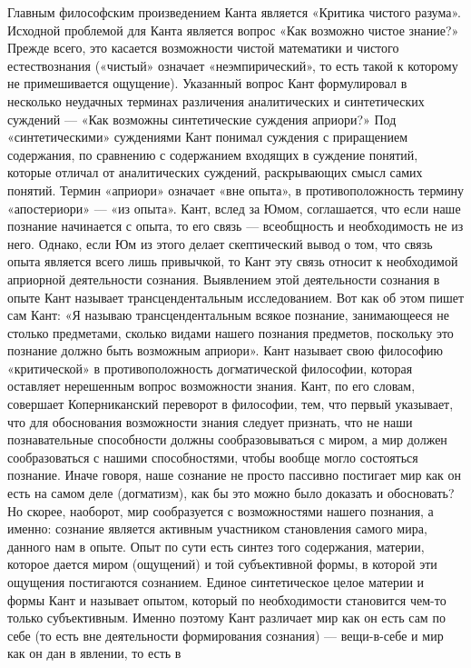 \documentclass[12pt]{article}
\begin{document}
Главным философским произведением Канта является «Критика чистого разума». Исходной проблемой для
Канта является вопрос «Как возможно чистое знание?» Прежде всего, это касается возможности чистой
математики и чистого естествознания («чистый» означает «неэмпирический», то есть такой к которому не
примешивается ощущение). Указанный вопрос Кант формулировал в несколько неудачных терминах
различения аналитических и синтетических суждений — «Как возможны синтетические суждения априори?»
Под «синтетическими» суждениями Кант понимал суждения с приращением содержания, по сравнению с
содержанием входящих в суждение понятий, которые отличал от аналитических суждений, раскрывающих
смысл самих понятий. Термин «априори» означает «вне опыта», в противоположность термину «апостериори»
— «из опыта». Кант, вслед за Юмом, соглашается, что если наше познание начинается с опыта, то его связь —
всеобщность и необходимость не из него. Однако, если Юм из этого делает скептический вывод о том, что связь
опыта является всего лишь привычкой, то Кант эту связь относит к необходимой априорной деятельности
сознания. Выявлением этой деятельности сознания в опыте Кант называет трансцендентальным исследованием.
Вот как об этом пишет сам Кант: «Я называю трансцендентальным всякое познание, занимающееся не столько
предметами, сколько видами нашего познания предметов, поскольку это познание должно быть возможным
априори». Кант называет свою философию «критической» в противоположность догматической философии,
которая оставляет нерешенным вопрос возможности знания. Кант, по его словам, совершает Коперниканский
переворот в философии, тем, что первый указывает, что для обоснования возможности знания следует признать,
что не наши познавательные способности должны сообразовываться с миром, а мир должен сообразоваться с
нашими способностями, чтобы вообще могло состояться познание. Иначе говоря, наше сознание не просто
пассивно постигает мир как он есть на самом деле (догматизм), как бы это можно было доказать и обосновать?
Но скорее, наоборот, мир сообразуется с возможностями нашего познания, а именно: сознание является
активным участником становления самого мира, данного нам в опыте. Опыт по сути есть синтез того
содержания, материи, которое дается миром (ощущений) и той субъективной формы, в которой эти ощущения
постигаются сознанием. Единое синтетическое целое материи и формы Кант и называет опытом, который по
необходимости становится чем-то только субъективным. Именно поэтому Кант различает мир как он есть сам
по себе (то есть вне деятельности формирования сознания) — вещи-в-себе и мир как он дан в явлении, то есть в
\end{document}
